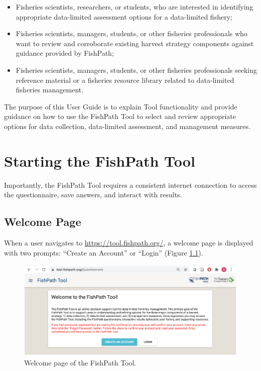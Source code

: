 \documentclass[
  11pt,
]{book}
\providecommand{\tightlist}{%
  \setlength{\itemsep}{0pt}\setlength{\parskip}{0pt}}
\begin{document}
\begin{itemize}
\tightlist
\item
  Fisheries scientists, researchers, or students, who are interested in identifying appropriate data-limited assessment options for a data-limited fishery;
\item
  Fisheries scientists, managers, students, or other fisheries professionals who want to review and corroborate existing harvest strategy components against guidance provided by FishPath;
\item
  Fisheries scientists, managers, students, or other fisheries professionals seeking reference material or a fisheries resource library related to data-limited fisheries management.
\end{itemize}

The purpose of this User Guide is to explain Tool functionality and provide guidance on how to use the FishPath Tool to select and review appropriate options for data collection, data-limited assessment, and management measures.

\hypertarget{starting-the-fishpath-tool}{%
\chapter{Starting the FishPath Tool}\label{starting-the-fishpath-tool}}

Importantly, the FishPath Tool requires a consistent internet connection to access the questionnaire, save answers, and interact with results.

\hypertarget{welcome-page}{%
\section{Welcome Page}\label{welcome-page}}

When a user navigates to \url{https://tool.fishpath.org/}, a welcome page is displayed with two prompts: ``Create an Account'' or ``Login'' (Figure \ref{fig:welcome}).

\begin{figure}

{\centering \includegraphics[width=0.95\linewidth]{images/welcome-page} 

}

\caption{Welcome page of the FishPath Tool.}\label{fig:welcome}
\end{figure}
\end{document}
